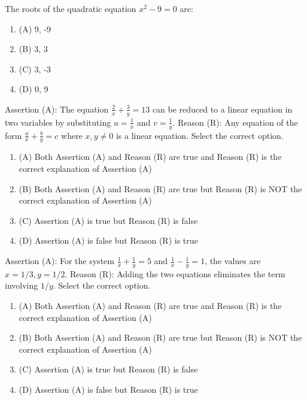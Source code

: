 \documentclass[12pt,a4paper]{exam}
\begin{document}
\begin{questions}
\question[1] The roots of the quadratic equation $x^2 - 9 = 0$ are:
\begin{enumerate}[label=(\Alph*)]
  \item (A) 9, -9
  \item (B) 3, 3
  \item (C) 3, -3
  \item (D) 0, 9
\end{enumerate}
\vspace{0.15cm}

\question[1] Assertion (A): The equation $\frac{2}{x} + \frac{3}{y} = 13$ can be reduced to a linear equation in two variables by substituting $u = \frac{1}{x}$ and $v = \frac{1}{y}$. Reason (R): Any equation of the form $\frac{a}{x} + \frac{b}{y} = c$ where $x, y \neq 0$ is a linear equation. Select the correct option.
\begin{enumerate}[label=(\Alph*)]
  \item (A) Both Assertion (A) and Reason (R) are true and Reason (R) is the correct explanation of Assertion (A)
  \item (B) Both Assertion (A) and Reason (R) are true but Reason (R) is NOT the correct explanation of Assertion (A)
  \item (C) Assertion (A) is true but Reason (R) is false
  \item (D) Assertion (A) is false but Reason (R) is true
\end{enumerate}
\vspace{0.15cm}

\question[1] Assertion (A): For the system $\frac{1}{x} + \frac{1}{y} = 5$ and $\frac{1}{x} - \frac{1}{y} = 1$, the values are $x = 1/3, y = 1/2$. Reason (R): Adding the two equations eliminates the term involving $1/y$. Select the correct option.
\begin{enumerate}[label=(\Alph*)]
  \item (A) Both Assertion (A) and Reason (R) are true and Reason (R) is the correct explanation of Assertion (A)
  \item (B) Both Assertion (A) and Reason (R) are true but Reason (R) is NOT the correct explanation of Assertion (A)
  \item (C) Assertion (A) is true but Reason (R) is false
  \item (D) Assertion (A) is false but Reason (R) is true
\end{enumerate}
\vspace{0.15cm}


\end{questions}
\end{document}
